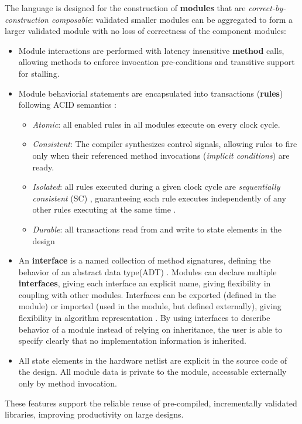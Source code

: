 The language is designed for
the construction of \textbf{modules}\cite{Parnas:1972} that are \textit{correct-by-construction composable}:
validated smaller modules can be aggregated to form
a larger validated module with
no loss of correctness of the component modules:
\begin{itemize}
\item Module interactions are performed with
latency insensitive\cite{Ng2010,AbbasB18}
\textbf{method} calls, allowing methods to enforce invocation pre-conditions
and transitive support for stalling.
\item Module behaviorial statements are encapsulated into transactions (\textbf{rules})
following ACID semantics
\cite{NikhilSemantics,GrayR93}:
\begin{itemize}
\item \textit{Atomic}: all enabled rules in all modules execute on every clock cycle.
\item \textit{Consistent}: The compiler synthesizes control signals, allowing rules to fire
only when their referenced method invocations (\textit{implicit conditions})
are ready.
\item \textit{Isolated}: all rules executed during a given clock cycle are
\textit{sequentially consistent} (SC) \cite{Lamport:1979:MMC:1311099.1311750},
guaranteeing each rule executes
independently of any other rules executing at the same time
\cite[Sec.~7.1]{GrayR93}.
\item \textit{Durable}: all transactions read from and write to state elements in the design
\end{itemize}

\item An \textbf{interface} is a named collection of method signatures, defining
the behavior of an abstract data type(ADT) \cite{Liskov74programmingwith}.
Modules can declare
multiple \textbf{interfaces}, giving each interface an explicit name,
giving flexibility in coupling with other modules.
Interfaces can be exported (defined in the module) or imported (used in
the module, but defined externally), giving flexibility in algorithm
representation \cite[Sec.~4.1]{Dave:ROB}.
By using interfaces to describe behavior of a module instead of relying
on inheritance, the user is able to specify clearly that no implementation
information is inherited.
\item All state elements in the hardware
netlist are explicit in the source code of the design.
All module data is private to the module, accessable externally only by method invocation.
\end{itemize}
These features support the reliable reuse of pre-compiled, incrementally validated
libraries, improving productivity on large designs.


